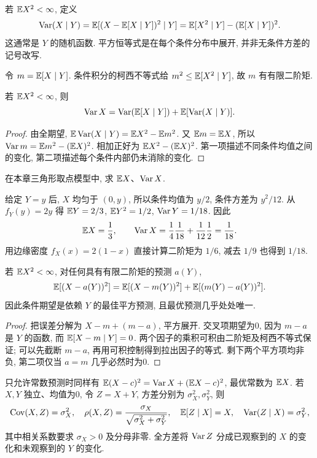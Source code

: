 \begin{definition}
若 $\mathbb E X^2<\infty$, 定义
\[\operatorname{Var}(X\mid Y)=\mathbb E[(X-\mathbb E[X\mid Y])^2\mid Y]
=\mathbb E[X^2\mid Y]-(\mathbb E[X\mid Y])^2.\]
这通常是 $Y$ 的随机函数. 平方恒等式是在每个条件分布中展开, 并非无条件方差的记号改写.
\end{definition}
令 $m=\mathbb E[X\mid Y]$. 条件积分的柯西不等式给 $m^2\le\mathbb E[X^2\mid Y]$, 故 $m$ 有有限二阶矩.
\begin{theorem}[全方差]
若 $\mathbb E X^2<\infty$, 则
\[\operatorname{Var} X=\operatorname{Var}(\mathbb E[X\mid Y])+\mathbb E[\operatorname{Var}(X\mid Y)].\]
\end{theorem}
\begin{proof}
由全期望,
$\mathbb E\operatorname{Var}(X\mid Y)=\mathbb E X^2-\mathbb E m^2$.
又 $\mathbb E m=\mathbb E X$, 所以
$\operatorname{Var} m=\mathbb E m^2-(\mathbb E X)^2$.
相加正好为 $\mathbb E X^2-(\mathbb E X)^2$. 第一项描述不同条件均值之间的变化, 第二项描述每个条件内部仍未消除的变化.
\end{proof}
\begin{example}
在本章三角形取点模型中, 求 $\mathbb E X$、$\operatorname{Var} X$.
\end{example}
\begin{solution}
给定 $Y=y$ 后, $X$ 均匀于 $(0,y)$, 所以条件均值为 $y/2$, 条件方差为 $y^2/12$. 从 $f_Y(y)=2y$ 得 $\mathbb E Y=2/3$, $\mathbb E Y^2=1/2$, $\operatorname{Var} Y=1/18$. 因此
\[\mathbb E X=\frac13,\qquad \operatorname{Var} X=\frac14\frac1{18}+\frac1{12}\frac12=\frac1{18}.\]
用边缘密度 $f_X(x)=2(1-x)$ 直接计算二阶矩为 $1/6$, 减去 $1/9$ 也得到 $1/18$.
\end{solution}
\begin{theorem}[平方损失下的最佳预测]
若 $\mathbb E X^2<\infty$, 对任何具有有限二阶矩的预测 $a(Y)$,
\[\mathbb E[(X-a(Y))^2]=\mathbb E[(X-m(Y))^2]+\mathbb E[(m(Y)-a(Y))^2].\]
因此条件期望是依赖 $Y$ 的最佳平方预测, 且最优预测几乎处处唯一.
\end{theorem}
\begin{proof}
把误差分解为 $X-m+(m-a)$, 平方展开. 交叉项期望为0, 因为 $m-a$ 是 $Y$ 的函数, 而 $\mathbb E[X-m\mid Y]=0$. 两个因子的乘积可积由二阶矩及柯西不等式保证; 可以先截断 $m-a$, 再用可积控制得到拉出因子的等式. 剩下两个平方项均非负, 第二项仅当 $a=m$ 几乎必然时为0.
\end{proof}
只允许常数预测时同样有
$\mathbb E(X-c)^2=\operatorname{Var} X+(\mathbb E X-c)^2$, 最优常数为 $\mathbb E X$.
若 $X,Y$ 独立、均值为0, 令 $Z=X+Y$, 方差分别为 $\sigma_X^2,\sigma_Y^2$, 则
\[\operatorname{Cov}(X,Z)=\sigma_X^2,\quad
\rho(X,Z)=\frac{\sigma_X}{\sqrt{\sigma_X^2+\sigma_Y^2}},\quad
\mathbb E[Z\mid X]=X,\quad\operatorname{Var}(Z\mid X)=\sigma_Y^2,\]
其中相关系数要求 $\sigma_X>0$ 及分母非零. 全方差将 $\operatorname{Var} Z$ 分成已观察到的 $X$ 的变化和未观察到的 $Y$ 的变化.


